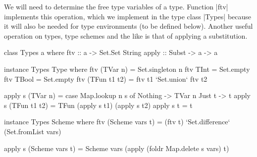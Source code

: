 \documentclass[a4paper,11pt]{article}
\begin{document}
We will need to determine the free type variables of a type.  Function
|ftv| implements this operation, which we implement in the type class
|Types| because it will also be needed for type environments (to be
defined below).  Another useful operation on types, type schemes and
the like is that of applying a substitution.
\begin{code}
class Types a where
    ftv    ::  a -> Set.Set String
    apply  ::  Subst -> a -> a
\end{code}

\begin{code}
instance Types Type where
    ftv (TVar n)      =  Set.singleton n
    ftv TInt          =  Set.empty
    ftv TBool         =  Set.empty
    ftv (TFun t1 t2)  =  ftv t1 `Set.union` ftv t2

    apply s (TVar n)      =  case Map.lookup n s of
                               Nothing  -> TVar n
                               Just t   -> t
    apply s (TFun t1 t2)  = TFun (apply s t1) (apply s t2)
    apply s t             =  t
\end{code}

\begin{code}
instance Types Scheme where
    ftv (Scheme vars t)      =  (ftv t) `Set.difference` (Set.fromList vars)

    apply s (Scheme vars t)  =  Scheme vars (apply (foldr Map.delete s vars) t)
\end{code}
\end{document}
